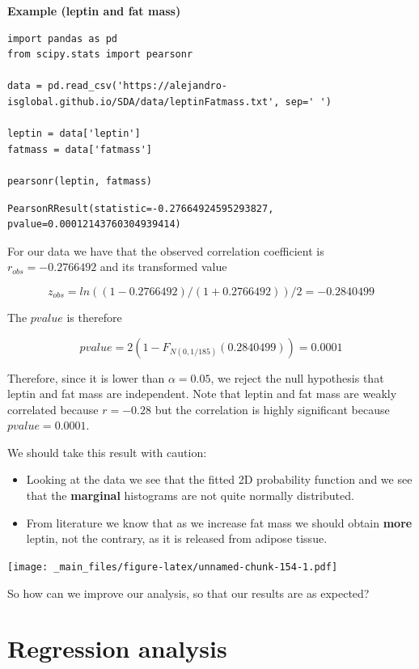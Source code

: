 \documentclass[
]{book}
\begin{document}
\textbf{Example (leptin and fat mass)}

\begin{verbatim}
import pandas as pd
from scipy.stats import pearsonr

data = pd.read_csv('https://alejandro-isglobal.github.io/SDA/data/leptinFatmass.txt', sep=' ')

leptin = data['leptin']
fatmass = data['fatmass']

pearsonr(leptin, fatmass)
\end{verbatim}

\begin{verbatim}
PearsonRResult(statistic=-0.27664924595293827, pvalue=0.00012143760304939414)
\end{verbatim}

For our data we have that the observed correlation coefficient is \(r_{obs}=-0.2766492\) and its transformed value

\[z_{obs}=ln((1-0.2766492)/(1+0.2766492))/2=-0.2840499\]

The \(pvalue\) is therefore

\[pvalue=2(1- F_{N(0,1/185)}(0.2840499))=0.0001\]

Therefore, since it is lower than \(\alpha=0.05\), we reject the null hypothesis that leptin and fat mass are independent. Note that leptin and fat mass are weakly correlated because \(r=-0.28\) but the correlation is highly significant because \(pvalue=0.0001\).

We should take this result with caution:

\begin{itemize}
\item
  Looking at the data we see that the fitted 2D probability function and we see that the \textbf{marginal} histograms are not quite normally distributed.
\item
  From literature we know that as we increase fat mass we should obtain \textbf{more} leptin, not the contrary, as it is released from adipose tissue.
\end{itemize}

\texttt{[image: \_main\_files/figure-latex/unnamed-chunk-154-1.pdf]}

So how can we improve our analysis, so that our results are as expected?

\hypertarget{regression-analysis}{%
\section{Regression analysis}\label{regression-analysis}}
\end{document}
